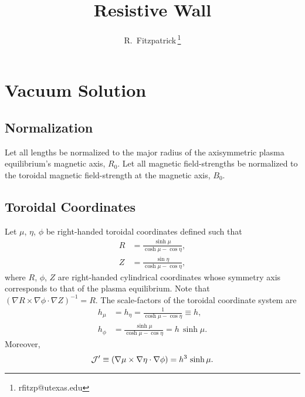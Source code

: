 \documentclass[12pt,prb,aps,notitlepage]{revtex4-1}
\begin{document}
\title{Resistive Wall}
\author{R.~Fitzpatrick\,\footnote{rfitzp@utexas.edu}}
\begin{abstract}
\end{abstract}
\maketitle

\section{Vacuum Solution}

\subsection{Normalization}
Let all lengths be normalized to the major radius of the  axisymmetric plasma equilibrium's magnetic axis, $R_0$. Let all
magnetic field-strengths be normalized to the toroidal magnetic field-strength at the magnetic axis, $B_0$.

\subsection{Toroidal Coordinates}
Let $\mu$, $\eta$, $\phi$ be right-handed toroidal coordinates defined such that
\begin{align}
R &= \frac{\sinh\mu}{\cosh\mu-\cos\eta},\\[0.5ex]
Z&=\frac{\sin\eta}{\cosh\mu-\cos\eta},
\end{align}
where $R$, $\phi$, $Z$ are right-handed cylindrical coordinates whose symmetry axis corresponds to that of the plasma equilibrium. 
Note that $(\nabla R\times \nabla\phi\cdot\nabla Z)^{-1}=R$. 
The scale-factors of the toroidal coordinate system are
\begin{align}
h_\mu&=h_\eta= \frac{1}{\cosh\mu-\cos\eta}\equiv h,\\[0.5ex]
h_\phi &= \frac{\sinh\mu}{\cosh\mu-\cos\eta} = h\,\sinh\mu.
\end{align}
Moreover, 
\begin{equation}
{\cal J}' \equiv (\nabla\mu\times\nabla\eta\cdot\nabla\phi)= h^3\,\sinh\mu.
\end{equation}
\end{document}
